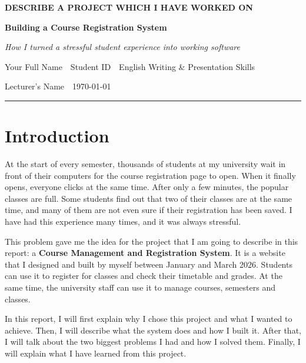 \documentclass[12pt,a4paper]{article}
\newcommand{\studentname}{Your Full Name}
\newcommand{\studentid}{Student ID}
\newcommand{\coursename}{English Writing \& Presentation Skills}
\newcommand{\lecturer}{Lecturer's Name}
\begin{document}
\thispagestyle{plain}
\begin{center}
  {\small\color{accent}\textbf{DESCRIBE A PROJECT WHICH I HAVE WORKED ON}\par}
  \vspace{0.3em}
  {\LARGE\bfseries\color{primary} Building a Course Registration System\par}
  \vspace{0.2em}
  {\itshape How I turned a stressful student experience into working software\par}
  \vspace{0.6em}
  {\small \studentname\ \textbullet\ \studentid\ \textbullet\ \coursename\par}
  {\small \lecturer\ \textbullet\ \today\par}
  \vspace{0.2em}
  {\color{accent}\rule{\textwidth}{0.8pt}}
\end{center}

\section{Introduction}

At the start of every semester, thousands of students at my university wait in
front of their computers for the course registration page to open. When it
finally opens, everyone clicks at the same time. After only a few minutes, the
popular classes are full. Some students find out that two of their classes are
at the same time, and many of them are not even sure if their registration has
been saved. I have had this experience many times, and it was always stressful.

This problem gave me the idea for the project that I am going to describe in
this report: a \textbf{Course Management and Registration System}. It is a
website that I designed and built by myself between January and March 2026.
Students can use it to register for classes and check their timetable and
grades. At the same time, the university staff can use it to manage courses,
semesters and classes.

In this report, I will first explain why I chose this project and what I
wanted to achieve. Then, I will describe what the system does and how I built
it. After that, I will talk about the two biggest problems I had and how I
solved them. Finally, I will explain what I have learned from this project.
\end{document}
